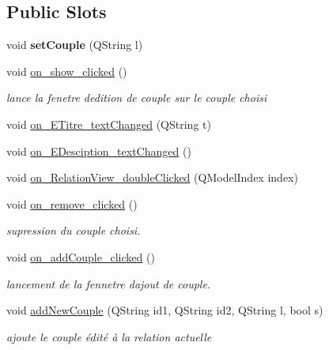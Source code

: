 \subsection*{Public Slots}
\begin{DoxyCompactItemize}
\item 
\mbox{\label{class_q_ui_relation_af3d9485700aafc469bd69adb2023d8d4}} 
void {\bfseries set\+Couple} (Q\+String l)
\item 
void \hyperlink{class_q_ui_relation_a66b413fb02bae1c7ce504395655cd47f}{on\+\_\+show\+\_\+clicked} ()
\begin{DoxyCompactList}\small\item\em lance la fenetre d\textquotesingle{}edition de couple sur le couple choisi \end{DoxyCompactList}\item 
void \hyperlink{class_q_ui_relation_aa21c9863da04b78e380733a49542c98b}{on\+\_\+\+E\+Titre\+\_\+text\+Changed} (Q\+String t)
\item 
void \hyperlink{class_q_ui_relation_a092e6a03e3ca7b4f6bb061d6b618edb0}{on\+\_\+\+E\+Desciption\+\_\+text\+Changed} ()
\item 
void \hyperlink{class_q_ui_relation_a28751a4ca2c2efb17c12bb45811a4b27}{on\+\_\+\+Relation\+View\+\_\+double\+Clicked} (Q\+Model\+Index index)
\item 
void \hyperlink{class_q_ui_relation_a14fddadaa70fa8c82a0e49a547e2f6b5}{on\+\_\+remove\+\_\+clicked} ()
\begin{DoxyCompactList}\small\item\em supression du couple choisi. \end{DoxyCompactList}\item 
void \hyperlink{class_q_ui_relation_ac818830c30b1bcd898e76308b07dc154}{on\+\_\+add\+Couple\+\_\+clicked} ()
\begin{DoxyCompactList}\small\item\em lancement de la fennetre d\textquotesingle{}ajout de couple. \end{DoxyCompactList}\item 
void \hyperlink{class_q_ui_relation_a05ca085cba21dd2c3004f1f77dd32872}{add\+New\+Couple} (Q\+String id1, Q\+String id2, Q\+String l, bool s)
\begin{DoxyCompactList}\small\item\em ajoute le couple édité à la relation actuelle \end{DoxyCompactList}\end{DoxyCompactItemize}
